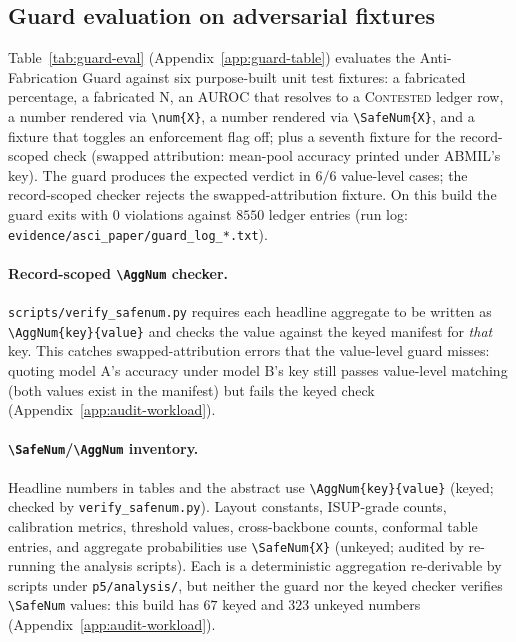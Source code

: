 \documentclass{article}
\newcommand{\SafeNum}[1]{#1}
\begin{document}
\subsection{Guard evaluation on adversarial fixtures}
\label{sec:guard-eval}

Table~\ref{tab:guard-eval} (Appendix~\ref{app:guard-table}) evaluates the Anti-Fabrication Guard against six purpose-built unit test fixtures: a fabricated percentage, a fabricated N, an AUROC that resolves to a \textsc{Contested} ledger row, a number rendered via \texttt{\textbackslash num\{X\}}, a number rendered via \texttt{\textbackslash SafeNum\{X\}}, and a fixture that toggles an enforcement flag off; plus a seventh fixture for the record-scoped check (swapped attribution: mean-pool accuracy printed under ABMIL's key). The guard produces the expected verdict in $\SafeNum{6}/\SafeNum{6}$ value-level cases; the record-scoped checker rejects the swapped-attribution fixture. On this build the guard exits with $\SafeNum{0}$ violations against $\SafeNum{8550}$ ledger entries (run log: \texttt{evidence/asci\_paper/guard\_log\_*.txt}).

\paragraph{Record-scoped \texttt{\textbackslash AggNum} checker.} \texttt{scripts/verify\_safenum.py} requires each headline aggregate to be written as \texttt{\textbackslash AggNum\{key\}\{value\}} and checks the value against the keyed manifest for \emph{that} key. This catches swapped-attribution errors that the value-level guard misses: quoting model A's accuracy under model B's key still passes value-level matching (both values exist in the manifest) but fails the keyed check (Appendix~\ref{app:audit-workload}).

\paragraph{\texttt{\textbackslash SafeNum}/\texttt{\textbackslash AggNum} inventory.} Headline numbers in tables and the abstract use \texttt{\textbackslash AggNum\{key\}\{value\}} (keyed; checked by \texttt{verify\_safenum.py}). Layout constants, ISUP-grade counts, calibration metrics, threshold values, cross-backbone counts, conformal table entries, and aggregate probabilities use \texttt{\textbackslash SafeNum\{X\}} (unkeyed; audited by re-running the analysis scripts). Each is a deterministic aggregation re-derivable by scripts under \texttt{p5/analysis/}, but neither the guard nor the keyed checker verifies \texttt{\textbackslash SafeNum} values: this build has $\SafeNum{67}$ keyed and $\SafeNum{323}$ unkeyed numbers (Appendix~\ref{app:audit-workload}).
\end{document}
